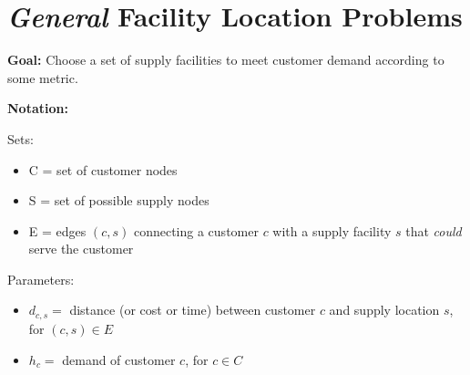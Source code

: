 \documentclass[11pt]{article}
\renewcommand{\labelitemi}{$\bullet$}
\theoremstyle{definition}
\begin{document}

\newpage
\section{\emph{General} Facility Location Problems}

\bigskip
\begin{tcolorbox}
\textbf{Goal:} Choose a set of supply facilities to meet customer demand according to some metric.  
\end{tcolorbox}

\textbf{Notation:}

Sets: 
\begin{itemize}
\item[]
 C = set of customer nodes 
\item[]
S = set of possible supply nodes 
\item[]
E = edges $(c,s)$ connecting a customer $c$ with a supply facility $s$ that \emph{could} serve the customer
\end{itemize}

Parameters: 
\begin{itemize}
\item[]
 $d_{c,s} =$ distance (or cost or time) between customer $c$ and supply location $s$, for $(c,s) \in E$
 \item[]
 $h_c =$ demand of customer $c$, for $c \in C$
\end{itemize}
\end{document}
